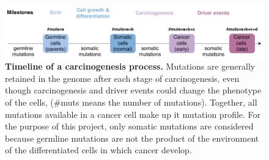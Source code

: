 \begin{figure}[h!]
    \centering
    \includegraphics[scale=0.78]{graphics/drivers_demo.pdf}
    \caption{\textbf{Timeline of a carcinogenesis process.} Mutations are generally retained in the genome after each stage of carcinogenesis, even though carcinogenesis and driver events could change the phenotype of the cells, (\#muts means the number of mutations). Together, all mutations available in a cancer cell make up it mutation profile. For the purpose of this project, only somatic mutations are considered because germline mutations are not the product of the environment of the differentiated cells in which cancer develop.}
    \label{fig:drivers_demo}
\end{figure}
